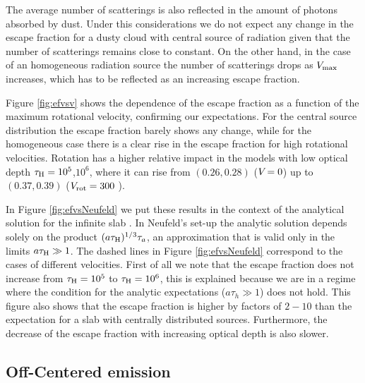 \documentclass{emulateapj}
\newcommand{\kms}{{\ifmmode{{\mathrm{\,km\ s}^{-1}}}\else{\,km~s$^{-1}$}\fi}}
\begin{document}
The average number of scatterings is also reflected in the amount of
photons absorbed by dust. Under this considerations we do not expect
any change in the escape fraction for a dusty cloud with central
source of radiation given that the number of scatterings remains close
to constant. On the other hand, in the case of an homogeneous
radiation source the number of scatterings drops as $V_{\rm max}$
increases, which has to be reflected as an increasing escape fraction.

Figure \ref{fig:efvsv} shows the dependence of the escape fraction as
a function of the maximum rotational velocity, confirming our expectations. For the central source
distribution the escape fraction barely shows any change, while for
the homogeneous case there is a clear rise in the escape fraction for
high rotational velocities.  Rotation has a higher relative impact in
the models with low optical depth $\tau_{\rm H}=10^5$,$10^{6}$, where
it can rise from $(0.26, 0.28)$ ($V_{\rm}=0$\kms) up to $(0.37, 0.39)$ ($V_{\rm
  rot}=300$ \kms). 

In Figure \ref{fig:efvsNeufeld} we put these results in the context of
the analytical solution for the infinite slab \citep{Neufeld90}. In
Neufeld's set-up the analytic solution depends solely on the product
$(a\tau_{\rm   H})^{1/3}\tau_{a}$, an approximation that is valid only
in the limits $a\tau_{\rm   H}\gg 1$. The dashed lines in Figure
\ref{fig:efvsNeufeld} correspond to the cases of different
velocities. First of all we note that the escape fraction does not
increase from $\tau_{\rm H}=10^{5}$ to $\tau_{\rm H}=10^{6}$, this is
explained because we are in a regime where the condition for the
analytic expectations  ($a\tau_{h}\gg 1$) does not hold. This figure
also shows that the escape fraction is higher by factors of $2-10$
than the expectation for a slab with centrally distributed
sources. Furthermore, the decrease of the escape fraction with
increasing optical depth is also slower.





\subsection{Off-Centered emission}
\end{document}
